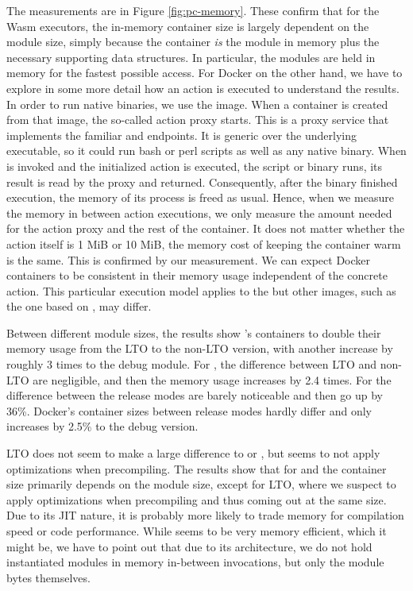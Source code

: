 The measurements are in Figure \ref{fig:pc-memory}. These confirm that for the Wasm executors, the in-memory container size is largely dependent on the module size, simply because the container \emph{is} the module in memory plus the necessary supporting data structures. In particular, the modules are held in memory for the fastest possible access. For Docker on the other hand, we have to explore in some more detail how an action is executed to understand the results. In order to run native binaries, we use the  image. When a container is created from that image, the so-called action proxy starts. This is a proxy service that implements the familiar  and  endpoints. It is generic over the underlying executable, so it could run bash or perl scripts as well as any native binary. When  is invoked and the initialized action is executed, the script or binary runs, its result is read by the proxy and returned. Consequently, after the binary finished execution, the memory of its process is freed as usual. Hence, when we measure the memory in between action executions, we only measure the amount needed for the action proxy and the rest of the container. It does not matter whether the action itself is 1 MiB or 10 MiB, the memory cost of keeping the container warm is the same. This is confirmed by our measurement. We can expect Docker containers to be consistent in their memory usage independent of the concrete action. This particular execution model applies to the  but other images, such as the one based on , may differ.

Between different module sizes, the results show 's containers to double their memory usage from the LTO to the non-LTO version, with another increase by roughly 3 times to the debug module. For , the difference between LTO and non-LTO are negligible, and then the memory usage increases by 2.4 times. For  the difference between the release modes are barely noticeable and then go up by 36\%. Docker's container sizes between release modes hardly differ and only increases by 2.5\% to the debug version.

LTO does not seem to make a large difference to  or , but  seems to not apply optimizations when precompiling.
The results show that for  and  the container size primarily depends on the module size, except for LTO, where we suspect  to apply optimizations when precompiling and thus coming out at the same size. Due to its JIT nature, it is probably more likely to trade memory for compilation speed or code performance.
While  seems to be very memory efficient, which it might be, we have to point out that due to its architecture, we do not hold instantiated modules in memory in-between  invocations, but only the module bytes themselves.

